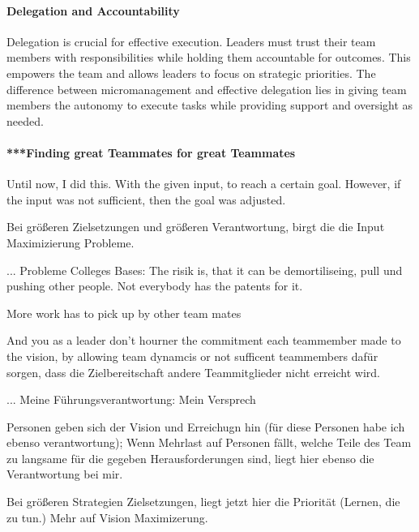 \paragraph{Delegation and Accountability}
Delegation is crucial for effective execution. Leaders must trust their team members with responsibilities while holding them accountable for outcomes. This empowers the team and allows leaders to focus on strategic priorities. The difference between micromanagement and effective delegation lies in giving team members the autonomy to execute tasks while providing support and oversight as needed.



\paragraph{***Finding great Teammates for great Teammates}






Until now, I did this. With the given input, to reach a certain goal. However, if the input was not sufficient, then the goal was adjusted.

Bei größeren Zielsetzungen und größeren Verantwortung, birgt die die Input Maximizierung Probleme.

... Probleme
Colleges Bases: The risik is, that it can be demortiliseing, pull und pushing other people. Not everybody has the patents for it.

More work has to pick up by other team mates

And you as a leader don't hourner the commitment each teammember made to the vision, by allowing team dynamcis or not sufficent teammembers dafür sorgen, dass die Zielbereitschaft andere Teammitglieder nicht erreicht wird.


... Meine Führungsverantwortung:
Mein Versprech

Personen geben sich der Vision und Erreichugn hin (für diese Personen habe ich ebenso verantwortung); Wenn Mehrlast auf Personen fällt, welche Teile des Team zu langsame für die gegeben Herausforderungen sind, liegt hier ebenso die Verantwortung bei mir.


Bei größeren Strategien Zielsetzungen, liegt jetzt hier die Priorität (Lernen, die zu tun.)
Mehr auf Vision Maximizerung.

